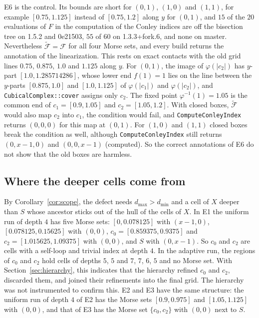 \documentclass[11pt]{article}
\theoremstyle{plain}
\theoremstyle{definition}
\theoremstyle{remark}
\newcommand{\Fc}{\mathcal{F}}
\newcommand{\Ft}{\tilde{\mathcal{F}}}
\newcommand{\dmin}{d_{\min}}
\newcommand{\dmax}{d_{\max}}
\newcommand{\code}[1]{\texttt{#1}}
\begin{document}
E6 is the control. Its bounds are short for $(0,1)$, $(1,0)$ and $(1,1)$, for example $[0.75,1.125]$ instead of $[0.75,1.2]$ along $y$ for $(0,1)$, and $15$ of the $20$ evaluations of $F$ in the computation of the Conley indices are off the bisection tree on 1.5.2 and 0e21503, $55$ of $60$ on 1.3.3+fork.6, and none on master. Nevertheless $\Ft=\Fc$ for all four Morse sets, and every build returns the annotation of the linearization. This rests on exact contacts with the old grid lines $0.75$, $0.875$, $1.0$ and $1.125$ along $y$. For $(0,1)$, the image of $\varphi(|c_2|)$ has $y$-part $[1.0,1.285714286]$, whose lower end $f(1)=1$ lies on the line between the $y$-parts $[0.875,1.0]$ and $[1.0,1.125]$ of $\varphi(|c_1|)$ and $\varphi(|c_2|)$, and \code{CubicalComplex::cover} assigns only $c_2$. The fixed point $\varphi^{-1}(1)=1.05$ is the common end of $c_1=[0.9,1.05]$ and $c_2=[1.05,1.2]$. With closed boxes, $\Ft$ would also map $c_2$ into $c_1$, the condition would fail, and \code{ComputeConleyIndex} returns $(0,0,0)$ for this map at $(0,1)$. For $(1,0)$ and $(1,1)$ closed boxes break the condition as well, although \code{ComputeConleyIndex} still returns $(0,x-1,0)$ and $(0,0,x-1)$ (computed). So the correct annotations of E6 do not show that the old boxes are harmless.

\subsection{Where the deeper cells come from}\label{sec:scope}

By Corollary~\ref{cor:scope}, the defect needs $\dmax>\dmin$ and a cell of $X$ deeper than $S$ whose ancestor sticks out of the hull of the cells of $X$. In E1 the uniform run of depth $4$ has five Morse sets: $[0,0.078125]$ with $(x-1,0)$, $[0.078125,0.15625]$ with $(0,0)$, $c_0=[0.859375,0.9375]$ and $c_2=[1.015625,1.09375]$ with $(0,0)$, and $S$ with $(0,x-1)$. So $c_0$ and $c_2$ are cells with a self-loop and trivial index at depth $4$. In the adaptive run, the regions of $c_0$ and $c_2$ hold cells of depths $5$, $5$ and $7$, $7$, $6$, $5$ and no Morse set. With Section~\ref{sec:hierarchy}, this indicates that the hierarchy refined $c_0$ and $c_2$, discarded them, and joined their refinements into the final grid. The hierarchy was not instrumented to confirm this. E2 and E3 have the same structure: the uniform run of depth $4$ of E2 has the Morse sets $[0.9,0.975]$ and $[1.05,1.125]$ with $(0,0)$, and that of E3 has the Morse set $\{c_0,c_2\}$ with $(0,0)$ next to $S$.
\end{document}
